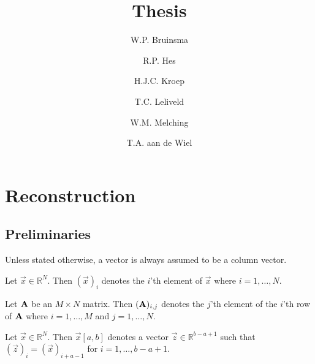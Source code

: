 \documentclass[a4paper, openany, oneside]{memoir}
\title{Thesis}
\author{W.P. Bruinsma \and R.P. Hes \and H.J.C. Kroep \and T.C. Leliveld \and W.M. Melching \and T.A. aan de Wiel}
\begin{document}
\frontmatter

\begin{titlingpage}
  \pagestyle{empty}
  \maketitle
\end{titlingpage}

\tableofcontents

\mainmatter

\chapter{Reconstruction}
\section{Preliminaries}
Unless stated otherwise, a vector is always assumed to be a column vector.

\begin{definition}
    Let $\vec{x} \in \mathbb{R}^N$. Then $(\vec{x})_i$ denotes the $i$'th element of $\vec{x}$ where $i = 1,\ldots,N$.
\end{definition}

\begin{definition}
    Let $\boldsymbol{\mathbf{A}}$ be an $M \times N$ matrix. Then $(\boldsymbol{\mathbf{A}})_{i,j}$ denotes the $j$'th element of the $i$'th row of $\boldsymbol{\mathbf{A}}$ where $i = 1,\ldots,M$ and $j=1,\ldots,N$.
\end{definition}

\begin{definition}[Subvector]
    Let $\vec{x} \in \mathbb{R}^N$. Then $\vec{x}[a,b]$ denotes a vector $\vec{z} \in \mathbb{R}^{b-a+1}$ such that $(\vec{z})_i = (\vec{x})_{i+a-1}$ for $i = 1,\ldots,b-a+1$.
\end{definition}
\end{document}
